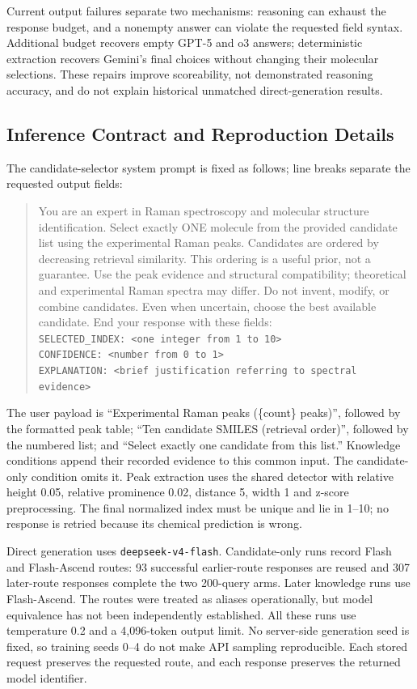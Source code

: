 Current output failures separate two mechanisms: reasoning can exhaust the response budget, and a nonempty answer can violate the requested field syntax. Additional budget recovers empty GPT-5 and o3 answers; deterministic extraction recovers Gemini's final choices without changing their molecular selections. These repairs improve scoreability, not demonstrated reasoning accuracy, and do not explain historical unmatched direct-generation results.

\subsection{Inference Contract and Reproduction Details}\label{sec:repro}
The candidate-selector system prompt is fixed as follows; line breaks separate the requested output fields:
\begin{quote}\small\raggedright
You are an expert in Raman spectroscopy and molecular structure identification.
Select exactly ONE molecule from the provided candidate list using the experimental Raman peaks.
Candidates are ordered by decreasing retrieval similarity. This ordering is a useful prior, not a guarantee.
Use the peak evidence and structural compatibility; theoretical and experimental Raman spectra may differ.
Do not invent, modify, or combine candidates. Even when uncertain, choose the best available candidate.
End your response with these fields:\\
\texttt{SELECTED\_INDEX: <one integer from 1 to 10>}\\
\texttt{CONFIDENCE: <number from 0 to 1>}\\
\texttt{EXPLANATION: <brief justification referring to spectral evidence>}
\end{quote}
The user payload is ``Experimental Raman peaks (\{count\} peaks)'', followed by the formatted peak table; ``Ten candidate SMILES (retrieval order)'', followed by the numbered list; and ``Select exactly one candidate from this list.'' Knowledge conditions append their recorded evidence to this common input. The candidate-only condition omits it. Peak extraction uses the shared detector with relative height 0.05, relative prominence 0.02, distance 5, width 1 and z-score preprocessing. The final normalized index must be unique and lie in 1--10; no response is retried because its chemical prediction is wrong.

Direct generation uses \texttt{deepseek-v4-flash}. Candidate-only runs record Flash and Flash-Ascend routes: 93 successful earlier-route responses are reused and 307 later-route responses complete the two 200-query arms. Later knowledge runs use Flash-Ascend. The routes were treated as aliases operationally, but model equivalence has not been independently established. All these runs use temperature 0.2 and a 4,096-token output limit. No server-side generation seed is fixed, so training seeds 0--4 do not make API sampling reproducible. Each stored request preserves the requested route, and each response preserves the returned model identifier.

